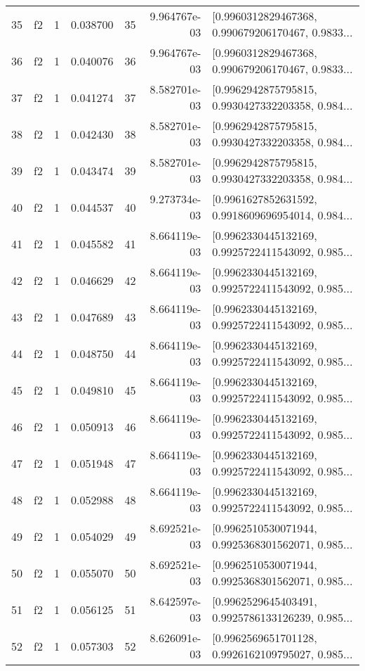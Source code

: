 \begin{tabular}{lllrlrl}
35  &  f2 &   1 &  0.038700 &   35 &  9.964767e-03 &  [0.9960312829467368, 0.990679206170467, 0.9833... \\
36  &  f2 &   1 &  0.040076 &   36 &  9.964767e-03 &  [0.9960312829467368, 0.990679206170467, 0.9833... \\
37  &  f2 &   1 &  0.041274 &   37 &  8.582701e-03 &  [0.9962942875795815, 0.9930427332203358, 0.984... \\
38  &  f2 &   1 &  0.042430 &   38 &  8.582701e-03 &  [0.9962942875795815, 0.9930427332203358, 0.984... \\
39  &  f2 &   1 &  0.043474 &   39 &  8.582701e-03 &  [0.9962942875795815, 0.9930427332203358, 0.984... \\
40  &  f2 &   1 &  0.044537 &   40 &  9.273734e-03 &  [0.9961627852631592, 0.9918609696954014, 0.984... \\
41  &  f2 &   1 &  0.045582 &   41 &  8.664119e-03 &  [0.9962330445132169, 0.9925722411543092, 0.985... \\
42  &  f2 &   1 &  0.046629 &   42 &  8.664119e-03 &  [0.9962330445132169, 0.9925722411543092, 0.985... \\
43  &  f2 &   1 &  0.047689 &   43 &  8.664119e-03 &  [0.9962330445132169, 0.9925722411543092, 0.985... \\
44  &  f2 &   1 &  0.048750 &   44 &  8.664119e-03 &  [0.9962330445132169, 0.9925722411543092, 0.985... \\
45  &  f2 &   1 &  0.049810 &   45 &  8.664119e-03 &  [0.9962330445132169, 0.9925722411543092, 0.985... \\
46  &  f2 &   1 &  0.050913 &   46 &  8.664119e-03 &  [0.9962330445132169, 0.9925722411543092, 0.985... \\
47  &  f2 &   1 &  0.051948 &   47 &  8.664119e-03 &  [0.9962330445132169, 0.9925722411543092, 0.985... \\
48  &  f2 &   1 &  0.052988 &   48 &  8.664119e-03 &  [0.9962330445132169, 0.9925722411543092, 0.985... \\
49  &  f2 &   1 &  0.054029 &   49 &  8.692521e-03 &  [0.9962510530071944, 0.9925368301562071, 0.985... \\
50  &  f2 &   1 &  0.055070 &   50 &  8.692521e-03 &  [0.9962510530071944, 0.9925368301562071, 0.985... \\
51  &  f2 &   1 &  0.056125 &   51 &  8.642597e-03 &  [0.9962529645403491, 0.9925786133126239, 0.985... \\
52  &  f2 &   1 &  0.057303 &   52 &  8.626091e-03 &  [0.9962569651701128, 0.9926162109795027, 0.985... \\

\end{tabular}
